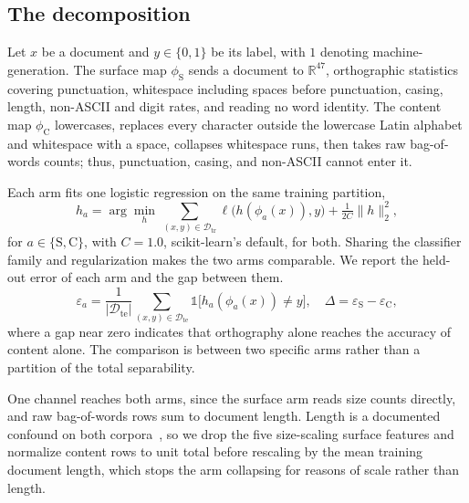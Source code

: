 \documentclass[conference,a4paper]{IEEEtran}
\begin{document}
\subsection{The decomposition}
\label{sec:decomp-def}

Let $x$ be a document and $y \in \{0,1\}$ be its label, with $1$ denoting machine-generation. The surface map $\phi_{\mathrm{S}}$ sends a document to $\mathbb{R}^{47}$, orthographic statistics covering punctuation, whitespace including spaces before punctuation, casing, length, non-ASCII and digit rates, and reading no word identity. The content map $\phi_{\mathrm{C}}$ lowercases, replaces every character outside the lowercase Latin alphabet and whitespace with a space, collapses whitespace runs, then takes raw bag-of-words counts; thus, punctuation, casing, and non-ASCII cannot enter it.

Each arm fits one logistic regression on the same training partition,
\begin{equation}
\label{eq:arm}
h_{a} = \arg\min_{h} \, \sum_{(x,y) \in \mathcal{D}_{\text{tr}}} \ell\big(h(\phi_{a}(x)), y\big) + \tfrac{1}{2C}\lVert h \rVert_2^2 ,
\end{equation}
for $a \in \{\mathrm{S},\mathrm{C}\}$, with $C=1.0$, scikit-learn's default, for both. Sharing the classifier family and regularization makes the two arms comparable. We report the held-out error of each arm and the gap between them.
\begin{equation}
\label{eq:gap}
\varepsilon_{a} = \frac{1}{|\mathcal{D}_{\text{te}}|}\!\!\sum_{(x,y) \in \mathcal{D}_{\text{te}}}\!\!\mathbb{1}\big[h_{a}(\phi_{a}(x)) \neq y\big],
\quad
\Delta = \varepsilon_{\mathrm{S}} - \varepsilon_{\mathrm{C}},
\end{equation}
where a gap near zero indicates that orthography alone reaches the accuracy of content alone. The comparison is between two specific arms rather than a partition of the total separability.

One channel reaches both arms, since the surface arm reads size counts directly, and raw bag-of-words rows sum to document length. Length is a documented confound on both corpora~\cite{Baidya2026detecting}, so we drop the five size-scaling surface features and normalize content rows to unit total before rescaling by the mean training document length, which stops the arm collapsing for reasons of scale rather than length.

\end{document}
